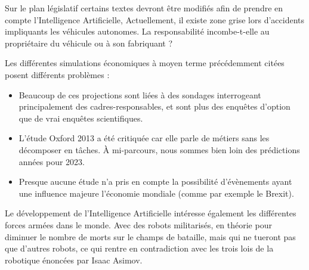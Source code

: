     Sur le plan législatif certains textes devront être modifiés afin de prendre en compte l'Intelligence Artificielle,
    Actuellement, il existe zone grise lors d'accidents impliquants les véhicules autonomes. La responsabilité incombe-t-elle au propriétaire
    du véhicule ou à son fabriquant ? \newline

    Les différentes simulations économiques à moyen terme précédemment citées posent différents problèmes :

    \begin{itemize}
        \item Beaucoup de ces projections sont liées à des sondages interrogeant principalement des cadres-responsables, et sont plus des
        enquêtes d'option que de vrai enquêtes scientifiques.\newline
        \item L'étude Oxford 2013 a été critiquée car elle parle de métiers sans les décomposer en tâches. À mi-parcours, nous sommes bien
        loin des prédictions années pour 2023.\newline
        \item Presque aucune étude n'a pris en compte la possibilité d'évènements ayant une influence majeure l'économie mondiale (comme par exemple
        le Brexit). \newline
    \end{itemize}

    Le développement de l'Intelligence Artificielle intéresse également les différentes forces armées dans le monde. Avec des robots militarisés,
    en théorie pour diminuer le nombre de morts sur le champs de bataille, mais qui ne tueront pas que d'autres robots, ce qui rentre en contradiction
    avec les trois lois de la robotique énoncées par Isaac Asimov. \newline